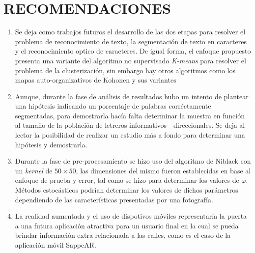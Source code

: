 \chapter*{RECOMENDACIONES}
\label{cap:trabajosfuturos}
\begin{enumerate}
	\item Se deja como trabajos futuros el desarrollo de las dos etapas para 
	resolver el problema de reconocimiento de texto, la segmentación de texto en
caracteres y el reconocimiento optico de caracteres. De igual forma, el enfoque
propuesto presenta una variante del algoritmo no supervisado \textit{K-means}
para resolver el problema de la clusterización, sin embargo hay otros algoritmos
como los mapas auto-organizativos de Kohonen y sus variantes
	
	\item Aunque, durante la fase de análisis de resultados hubo un intento de 
	plantear una hipótesis indicando un porcentaje de palabras corréctamente
segmentadas, para demostrarla hacía falta determinar la muestra en función al
tamaño de la población de letreros informativos - direccionales. Se deja al
lector la posibilidad de realizar un estudio más a fondo para determinar una
hipótesis y demostrarla. 
	
	\item Durante la fase de pre-procesamiento se hizo uso del algoritmo de 
	Niblack con un \textit{kernel} de $50 \times 50$, las dimensiones del mismo
fueron establecidas en base al enfoque de prueba y error, tal como se hizo para
determinar los valores de $\varphi$. Métodos estocásticos podrían determinar los
valores de dichos parámetros dependiendo de las características presentadas por
una fotografía.

	\item La realidad aumentada y el uso de dispotivos móviles representaría la 
	puerta a una futura aplicación atractiva para un usuario final en la cual se
pueda brindar información extra relacionada a las calles, como es el caso de la
aplicación móvil SappeAR.\cite{Sappear:web}
\end{enumerate}
